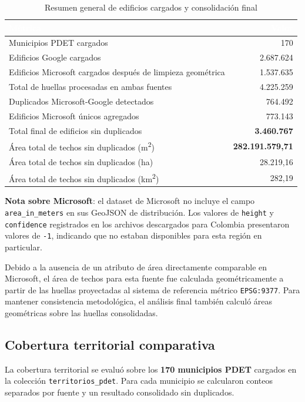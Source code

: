 \documentclass{article}
\newcommand{\tblhdr}[1]{%
  \cellcolor{azulclaro}\textbf{\textcolor{white}{#1}}%
}
\begin{document}
\begin{table}[H]
\centering
\caption{Resumen general de edificios cargados y consolidación final}
\begin{tabular}{p{8cm} r}
\toprule
\tblhdr{Métrica} & \tblhdr{Valor} \\
\midrule
Municipios PDET cargados & 170 \\
\rowcolor{grisfilas}
Edificios Google cargados & 2.687.624 \\
Edificios Microsoft cargados después de limpieza geométrica & 1.537.635 \\
\rowcolor{grisfilas}
Total de huellas procesadas en ambas fuentes & 4.225.259 \\
Duplicados Microsoft-Google detectados & 764.492 \\
\rowcolor{grisfilas}
Edificios Microsoft únicos agregados & 773.143 \\
Total final de edificios sin duplicados & \textbf{3.460.767} \\
\rowcolor{grisfilas}
Área total de techos sin duplicados (m\textsuperscript{2}) & 
\textbf{282.191.579,71} \\
Área total de techos sin duplicados (ha) & 28.219,16 \\
Área total de techos sin duplicados (km\textsuperscript{2}) & 282,19 \\
\bottomrule
\end{tabular}
\end{table}

\textbf{Nota sobre Microsoft}: el dataset de Microsoft no incluye el campo \texttt{area\_in\_meters} en sus GeoJSON de distribución. Los valores de \texttt{height} y \texttt{confidence} registrados en los archivos descargados para Colombia presentaron valores de \texttt{-1}, indicando que no estaban disponibles para esta región en particular.

Debido a la ausencia de un atributo de área directamente comparable en Microsoft, el área de techos para esta fuente fue calculada geométricamente a partir de las huellas proyectadas al sistema de referencia métrico \texttt{EPSG:9377}. Para mantener consistencia metodológica, el análisis final también calculó áreas geométricas sobre las huellas consolidadas.

\subsection{Cobertura territorial comparativa}

La cobertura territorial se evaluó sobre los \textbf{170 municipios PDET} cargados en la colección \texttt{territorios\_pdet}. Para cada municipio se calcularon conteos separados por fuente y un resultado consolidado sin duplicados.
\end{document}
